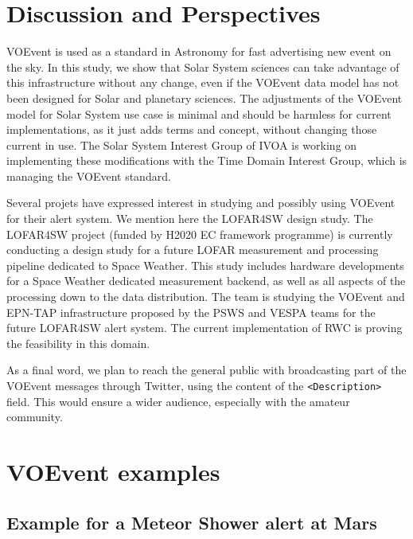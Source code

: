 \documentclass[referee,a4paper,12pt,traditabstract]{swsc}
\begin{document}
\begin{linenumbers}
\section{Discussion and Perspectives}

VOEvent is used as a standard in Astronomy for fast advertising new event on the sky. In this study, we show that Solar System sciences can take advantage of this infrastructure without any change, even if the VOEvent data model has not been designed for Solar and planetary sciences. The adjustments of the VOEvent model for Solar System use case is minimal and should be harmless for current implementations, as it just adds terms and concept, without changing those current in use. The Solar System Interest Group of IVOA is working on implementing these modifications with the Time Domain Interest Group, which is managing the VOEvent standard. 

Several projets have expressed interest in studying and possibly using VOEvent for their alert system. We mention here the LOFAR4SW design study.
The LOFAR4SW project (funded by H2020 EC framework programme) is currently conducting a design study for a future LOFAR measurement and processing pipeline dedicated to Space Weather. This study includes hardware developments for a Space Weather dedicated measurement backend, as well as all aspects of the processing down to the data distribution. The team is studying the VOEvent and EPN-TAP infrastructure proposed by the PSWS and VESPA teams for the future LOFAR4SW alert system. The current implementation of RWC is proving the feasibility in this domain. 

As a final word, we plan to reach the general public with broadcasting part of the VOEvent messages through Twitter, using the content of the {\tt <Description>} field. This would ensure a wider audience, especially with the amateur community.




\appendix

\section{VOEvent examples}

\subsection{Example for a Meteor Shower alert at Mars}
\label{appendix-xml-voevent-meteor}


\end{linenumbers}
\end{document}
